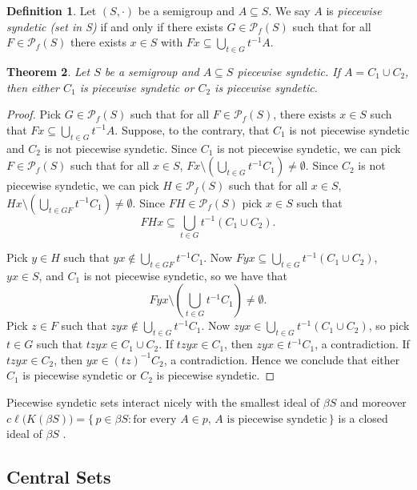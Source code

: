 \documentclass[12pt,showtrims]{memoir}
\theoremstyle{plain}
\newtheorem{thm}{Theorem}[section]
\theoremstyle{definition}
\newtheorem{defn}[thm]{Definition}
\newcommand{\Pf}{\mathcal{P}_f}
\begin{document}
\begin{defn}
  Let $(S, \cdot)$ be a semigroup and $A \subseteq S$.
  We say $A$ is \textsl{piecewise syndetic (set in S)} if and only if there exists $G \in \Pf(S)$ such that for all $F \in \Pf(S)$ there exists $x \in S$ with $Fx \subseteq \bigcup_{t \in G} t^{-1}A$.
\end{defn}

\begin{thm}
  \label{prop:psReg}
  Let $S$ be a semigroup and $A \subseteq S$ piecewise syndetic.
  If $A = C_1 \cup C_2$, then either $C_1$ is piecewise syndetic or $C_2$ is piecewise syndetic.
\end{thm}
\begin{proof}
  Pick $G \in \Pf(S)$ such that for all $F \in \Pf(S)$, there exists $x \in S$ such that $Fx \subseteq \bigcup_{t \in G} t^{-1}A$. 
  Suppose, to the contrary, that $C_1$ is not piecewise syndetic and $C_2$ is not piecewise syndetic. 
  Since $C_1$ is not piecewise syndetic, we can pick $F \in \Pf(S)$ such that for all $x \in S$, $Fx \setminus (\bigcup_{t \in G} t^{-1}C_1) \ne \emptyset$. 
  Since $C_2$ is not piecewise syndetic, we can pick $H \in \Pf(S)$ such that for all $x \in S$, $Hx \setminus (\bigcup_{t \in GF} t^{-1}C_1) \ne \emptyset$.
  Since $FH \in \Pf(S)$ pick $x \in S$ such that 
  \[
    FHx \subseteq \bigcup_{t \in G} t^{-1}(C_1 \cup C_2). 
  \]
  
  Pick $y \in H$ such that $yx \not\in \bigcup_{t \in GF} t^{-1}C_1$. 
  Now $Fyx \subseteq \bigcup_{t \in G} t^{-1}(C_1 \cup C_2)$, $yx \in S$, and $C_1$ is not piecewise syndetic, so we have that 
  \[
    Fyx \setminus (\bigcup_{t \in G} t^{-1}C_1) \ne \emptyset. 
  \]
  Pick $z \in F$ such that $zyx \not\in \bigcup_{t \in G} t^{-1}C_1$. 
  Now $zyx \in \bigcup_{t \in G} t^{-1}(C_1 \cup C_2)$, so pick $t \in G$ such that $tzyx \in C_1 \cup C_2$. 
  If $tzyx \in C_1$, then $zyx \in t^{-1}C_1$, a contradiction.
  If $tzyx \in C_2$, then $yx \in (tz)^{-1}C_2$, a contradiction.
  Hence we conclude that either $C_1$ is piecewise syndetic or $C_2$ is piecewise syndetic.
\end{proof}

  Piecewise syndetic sets interact nicely with the smallest ideal of $\beta S$ \cite[Theorem 4.40]{Hindman:1998fk} and moreover $c\ell\bigl(K(\beta S)\bigr) = \{\, p \in \beta S : \mbox{for every $A \in p$, $A$ is piecewise syndetic} \,\}$ is a closed ideal of $\beta S$ \cite[Corollary 4.41 and Theorem 4.44]{Hindman:1998fk}. 

\subsection{Central Sets}
\end{document}
